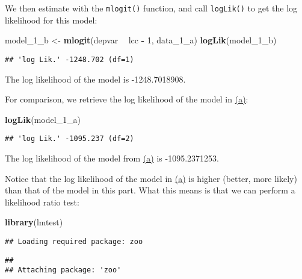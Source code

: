 \documentclass[
]{article}
\newenvironment{Shaded}{\begin{snugshade}}{\end{snugshade}}
\newcommand{\DecValTok}[1]{\textcolor[rgb]{0.00,0.00,0.81}{#1}}
\newcommand{\KeywordTok}[1]{\textcolor[rgb]{0.13,0.29,0.53}{\textbf{#1}}}
\newcommand{\NormalTok}[1]{#1}
\newcommand{\OperatorTok}[1]{\textcolor[rgb]{0.81,0.36,0.00}{\textbf{#1}}}
\newcommand{\StringTok}[1]{\textcolor[rgb]{0.31,0.60,0.02}{#1}}
\begin{document}
We then estimate with the \texttt{mlogit()} function, and call
\texttt{logLik()} to get the log likelihood for this model:

\begin{Shaded}
\begin{Highlighting}[]
\NormalTok{model_}\DecValTok{1}\NormalTok{_b <-}\StringTok{ }\KeywordTok{mlogit}\NormalTok{(depvar }\OperatorTok{~}\StringTok{ }\NormalTok{lcc }\OperatorTok{-}\StringTok{ }\DecValTok{1}\NormalTok{, data_}\DecValTok{1}\NormalTok{_a)}
\KeywordTok{logLik}\NormalTok{(model_}\DecValTok{1}\NormalTok{_b)}
\end{Highlighting}
\end{Shaded}

\begin{verbatim}
## 'log Lik.' -1248.702 (df=1)
\end{verbatim}

The log likelihood of the model is -1248.7018908.

For comparison, we retrieve the log likelihood of the model in
\protect\hyperlink{onea}{(a)}:

\begin{Shaded}
\begin{Highlighting}[]
\KeywordTok{logLik}\NormalTok{(model_}\DecValTok{1}\NormalTok{_a)}
\end{Highlighting}
\end{Shaded}

\begin{verbatim}
## 'log Lik.' -1095.237 (df=2)
\end{verbatim}

The log likelihood of the model from \protect\hyperlink{onea}{(a)} is
-1095.2371253.

Notice that the log likelihood of the model in
\protect\hyperlink{onea}{(a)} is higher (better, more likely) than that
of the model in this part. What this means is that we can perform a
likelihood ratio test:

\begin{Shaded}
\begin{Highlighting}[]
\KeywordTok{library}\NormalTok{(lmtest)}
\end{Highlighting}
\end{Shaded}

\begin{verbatim}
## Loading required package: zoo
\end{verbatim}

\begin{verbatim}
## 
## Attaching package: 'zoo'
\end{verbatim}
\end{document}
